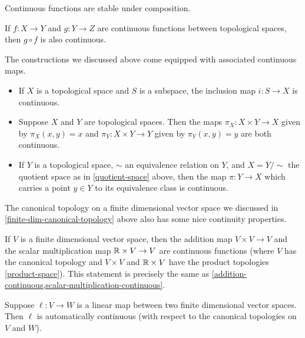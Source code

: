 Continuous functions are stable under composition. 

\begin{exercise}
	If $f : X \to Y$ and $g : Y \to Z$ are continuous functions between topological spaces, then $g \circ f$ is also continuous. 
\end{exercise}

The constructions we discussed above come equipped with associated continuous maps. 
\begin{itemize}
	\item If $X$ is a topological space and $S$ is a subspace, the inclusion map $i : S \to X$ is continuous. 
	\item Suppose $X$ and $Y$ are topological spaces. Then the maps $\pi_X : X \times Y \to X$ given by $\pi_X(x,y) = x$ and $\pi_Y : X \times Y \to Y$ given by $\pi_Y(x,y) = y$ are both continuous. 
	\item If $Y$ is a topological space, $\sim$ an equivalence relation on $Y$, and $X = Y/\sim$ the quotient space as in \cref{quotient-space} above, then the map $\pi : Y \to X$ which carries a point $y \in Y$ to its equivalence class is continuous.
\end{itemize}

The canonical topology on a finite dimensional vector space we discussed in \cref{finite-dim-canonical-topology} above also has some nice continuity properties. 

\begin{example}
	If $V$ is a finite dimensional vector space, then the addition map $V \times V \to V$ and the scalar multiplication map $\mathbb{R} \times V \to V$ are continuous functions (where $V$ has the canonical topology and $V \times V$ and $\mathbb{R} \times V$ have the product topologies \ref{product-space}). This statement is precisely the same as \cref{addition-continuous,scalar-multiplication-continuous}.
\end{example}


\begin{lemma} \label{linear-continuous}
	Suppose $\ell : V \to W$ is a linear map between two finite dimensional vector spaces. Then $\ell$ is automatically continuous (with respect to the canonical topologies on $V$ and $W$). 
\end{lemma}

